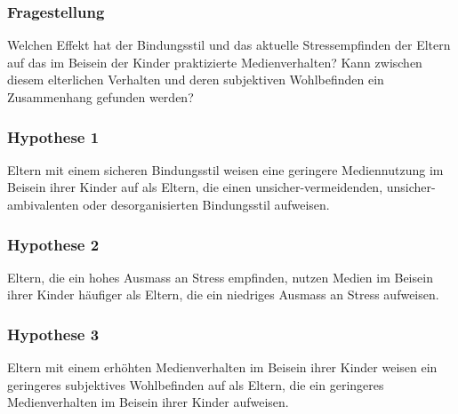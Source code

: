\subsubsection{Fragestellung} 
Welchen Effekt hat der Bindungsstil und das aktuelle Stressempfinden der Eltern auf das im Beisein der Kinder praktizierte Medienverhalten? Kann zwischen diesem elterlichen Verhalten und deren subjektiven Wohlbefinden ein Zusammenhang gefunden werden?
\subsubsection{Hypothese 1}
Eltern mit einem sicheren Bindungsstil weisen eine geringere Mediennutzung im Beisein ihrer Kinder auf als Eltern, die einen unsicher-vermeidenden, unsicher-ambivalenten oder desorganisierten Bindungsstil aufweisen.
\subsubsection{Hypothese 2}
Eltern, die ein hohes Ausmass an Stress empfinden, nutzen Medien im Beisein ihrer Kinder häufiger als Eltern, die ein niedriges Ausmass an Stress aufweisen.
\subsubsection{Hypothese 3}
Eltern mit einem erhöhten Medienverhalten im Beisein ihrer Kinder weisen ein geringeres subjektives Wohlbefinden auf als Eltern, die ein geringeres Medienverhalten im Beisein ihrer Kinder aufweisen.
